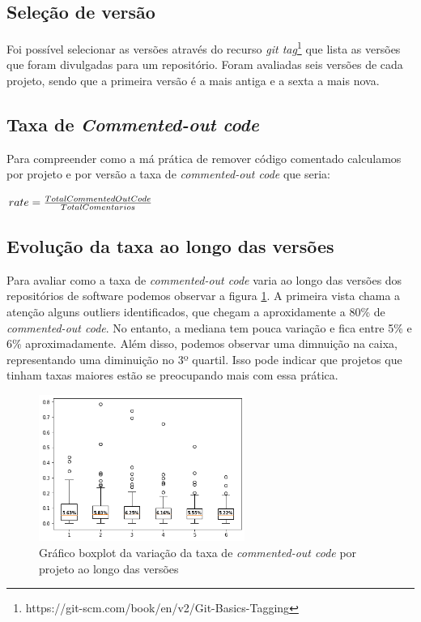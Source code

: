 \documentclass[12pt]{article}
\begin{document}
\subsection{Seleção de versão}

Foi possível selecionar as versões através do recurso \textit{git tag}\footnote{https://git-scm.com/book/en/v2/Git-Basics-Tagging}
que lista as versões que foram divulgadas para um repositório. Foram avaliadas seis versões
de cada projeto, sendo que a primeira versão é a mais antiga e a sexta a mais nova.

\subsection{Taxa de \textit{Commented-out code}}

Para compreender como a má prática de remover código comentado calculamos
por projeto e por versão a taxa de \textit{commented-out code} que seria: 

\begin{math}\centering
  rate = \frac{TotalCommentedOutCode}{TotalComentarios}
\end{math}

\subsection{Evolução da taxa ao longo das versões}

Para avaliar como a taxa de \textit{commented-out code} varia ao longo das
versões dos repositórios de software podemos observar a figura \ref{fig:bp}.
A primeira vista chama a atenção alguns outliers identificados, que
chegam a aproxidamente a 80\% de \textit{commented-out code}. No entanto, a mediana
tem pouca variação e fica entre 5\% e 6\% aproximadamente. Além disso, podemos 
observar uma dimnuição na caixa, representando uma diminuição no 3º quartil. Isso pode
indicar que projetos que tinham taxas maiores estão se preocupando mais com essa prática.


\begin{figure}[ht]
  \centering
  \includegraphics[width=0.6\textwidth]{../images/box-plot.png}
  \caption{Gráfico boxplot da variação da taxa de \textit{commented-out code}
  por projeto ao longo das versões}
  \label{fig:bp}
\end{figure}
\end{document}
